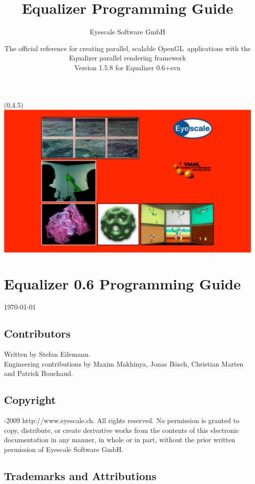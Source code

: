 \documentclass[10pt,a4]{scrartcl}
\title{Equalizer Programming Guide}
\author{Eyescale Software GmbH}
\date{
  \vspace{15cm}
  {\Large\sffamily The official reference for creating parallel,
    scalable OpenGL\texttrademark\ applications with the Equalizer
    parallel rendering framework}\\\vspace{1cm}
  Version 1.5.8 for Equalizer 0.6+svn\\[\medskipamount]
}
\begin{document}
\pagestyle{empty}
\maketitle
\thispagestyle{empty}
\begin{textblock}{}(0,4.5)
  \hspace{-1cm}\includegraphics[width=22cm]{images/teaser.pdf}
\end{textblock}

\clearpage

\lstset{language=C++}
\section*{Equalizer 0.6 Programming Guide}
\today
\subsection*{Contributors}

Written by Stefan Eilemann.\\
Engineering contributions by Maxim Makhinya, Jonas B\"osch, Christian
Marten and Patrick Bouchaud.

\subsection*{Copyright}

-2009 
{http://www.eyescale.ch}. All rights reserved. No permission is
granted to copy, distribute, or create derivative works from the
contents of this electronic documentation in any manner, in whole or in
part, without the prior written permission of Eyescale Software GmbH.

\subsection*{Trademarks and Attributions}
\end{document}
